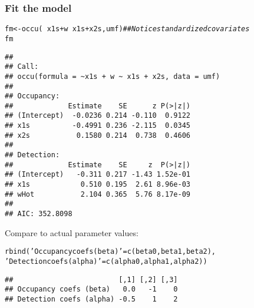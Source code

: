 \documentclass[color=usenames,dvipsnames]{beamer}\usepackage[]{graphicx}\usepackage[]{color}
\makeatletter
\newcommand{\hlstr}[1]{\textcolor[rgb]{0.749,0.012,0.012}{#1}}%
\newcommand{\hlcom}[1]{\textcolor[rgb]{0.514,0.506,0.514}{\textit{#1}}}%
\newcommand{\hlopt}[1]{\textcolor[rgb]{0,0,0}{#1}}%
\newcommand{\hlstd}[1]{\textcolor[rgb]{0,0,0}{#1}}%
\newcommand{\hlkwb}[1]{\textcolor[rgb]{0,0.341,0.682}{#1}}%
\newcommand{\hlkwd}[1]{\textcolor[rgb]{0.004,0.004,0.506}{#1}}%
\newenvironment{kframe}{%
 \def\at@end@of@kframe{}%
 \ifinner\ifhmode%
  \def\at@end@of@kframe{\end{minipage}}%
  \begin{minipage}{\columnwidth}%
 \fi\fi%
 \def\FrameCommand##1{\hskip\@totalleftmargin \hskip-\fboxsep
 \colorbox{shadecolor}{##1}\hskip-\fboxsep
     \hskip-\linewidth \hskip-\@totalleftmargin \hskip\columnwidth}%
 \MakeFramed {\advance\hsize-\width
   \@totalleftmargin\z@ \linewidth\hsize
   \@setminipage}}%
 {\par\unskip\endMakeFramed%
 \at@end@of@kframe}
\newenvironment{knitrout}{}{} %
\makeatother
\begin{document}
\begin{frame}[fragile]
  \frametitle{Fit the model}
  \footnotesize
\begin{knitrout}\tiny
{}\color{fgcolor}\begin{kframe}
\begin{alltt}
\hlstd{fm} \hlkwb{<-} \hlkwd{occu}\hlstd{(}\hlopt{~}\hlstd{x1s}\hlopt{+}\hlstd{w} \hlopt{~}\hlstd{x1s}\hlopt{+}\hlstd{x2s, umf)}    \hlcom{## Notice standardized covariates}
\hlstd{fm}
\end{alltt}
\begin{verbatim}
## 
## Call:
## occu(formula = ~x1s + w ~ x1s + x2s, data = umf)
## 
## Occupancy:
##             Estimate    SE      z P(>|z|)
## (Intercept)  -0.0236 0.214 -0.110  0.9122
## x1s          -0.4991 0.236 -2.115  0.0345
## x2s           0.1580 0.214  0.738  0.4606
## 
## Detection:
##             Estimate    SE     z  P(>|z|)
## (Intercept)   -0.311 0.217 -1.43 1.52e-01
## x1s            0.510 0.195  2.61 8.96e-03
## wHot           2.104 0.365  5.76 8.17e-09
## 
## AIC: 352.8098
\end{verbatim}
\end{kframe}
\end{knitrout}
\pause
\vfill
Compare to actual parameter values:
\begin{knitrout}\tiny
{}\color{fgcolor}\begin{kframe}
\begin{alltt}
\hlkwd{rbind}\hlstd{(}\hlstr{'Occupancy coefs (beta)'}\hlstd{=}\hlkwd{c}\hlstd{(beta0, beta1, beta2),}
      \hlstr{'Detection coefs (alpha)'}\hlstd{=}\hlkwd{c}\hlstd{(alpha0, alpha1, alpha2))}
\end{alltt}
\begin{verbatim}
##                         [,1] [,2] [,3]
## Occupancy coefs (beta)   0.0   -1    0
## Detection coefs (alpha) -0.5    1    2
\end{verbatim}
\end{kframe}
\end{knitrout}
\end{frame}
\end{document}
